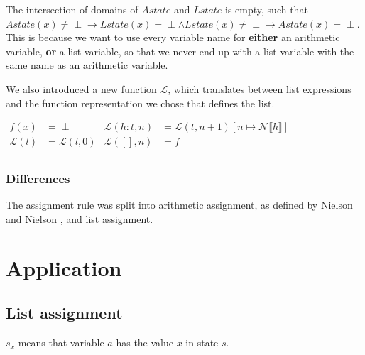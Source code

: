 \documentclass[12pt]{article}
\newcommand{\dblbr}[1]{\llbracket#1\rrbracket}
\newcommand{\LL}{\mathcal{L}}
\newcommand{\NN}{\mathcal{N}}
\begin{document}
The intersection of domains of $Astate$ and $Lstate$ is empty, such that $Astate(x) \neq \perp \rightarrow Lstate(x) = \perp \land Lstate(x) \neq \perp \rightarrow Astate(x) = \perp$. This is because we want to use every variable name for \textbf{either} an arithmetic variable, \textbf{or} a list variable, so that we never end up with a list variable with the same name as an arithmetic variable.

We also introduced a new function $\LL$, which translates between list expressions and the function representation we chose that defines the list.

$\begin{aligned}
    f(x) &= \perp & \LL(h:t, n) &= \LL(t, n + 1)[n \mapsto \NN \dblbr{h}]\\
    \LL(l) &= \LL(l, 0) & \LL([], n) &= f\\
\end{aligned}$

\subsubsection{Differences}

The assignment rule was split into arithmetic assignment, as defined by Nielson and Nielson \cite{wiley}, and list assignment.

\section{Application}

\subsection{List assignment}
$s_x$ means that variable $a$ has the value $x$ in state $s$.

\begin{mathpar}
\end{mathpar}

\printbibliography
\end{document}
